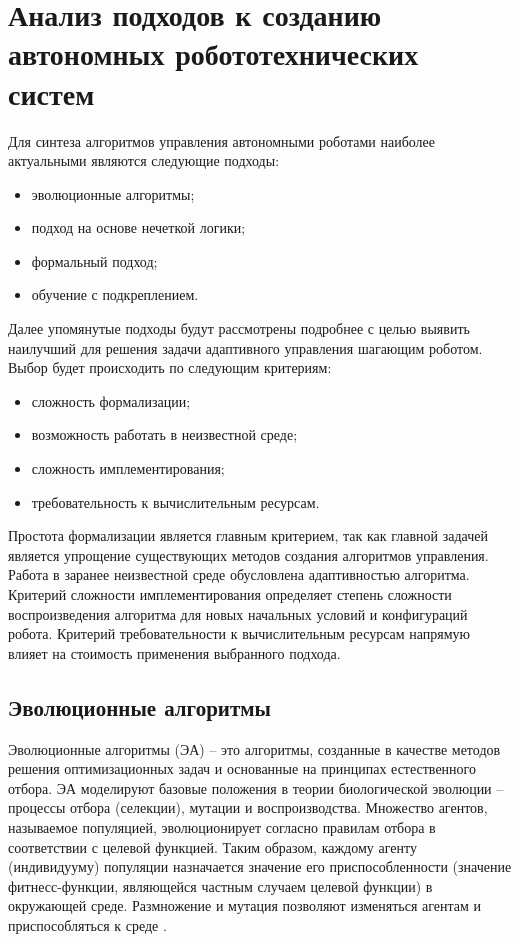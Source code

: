 \section{Анализ подходов к созданию автономных робототехнических систем} \label{literature}

Для синтеза алгоритмов управления автономными роботами наиболее актуальными являются следующие подходы:
\begin{itemize}
	\item эволюционные алгоритмы;
	\item подход на основе нечеткой логики;
	\item формальный подход;
	\item обучение с подкреплением.

\end{itemize}

Далее упомянутые подходы будут рассмотрены подробнее с целью выявить наилучший для решения задачи адаптивного управления шагающим роботом. 
Выбор будет происходить по следующим критериям:
\begin{itemize}
	\item сложность формализации;
	\item возможность работать в неизвестной среде;
	\item сложность имплементирования;
	\item требовательность к вычислительным ресурсам.
\end{itemize}

Простота формализации является главным критерием, так как главной задачей является упрощение существующих методов создания алгоритмов управления. 
Работа в заранее неизвестной среде обусловлена адаптивностью алгоритма. 
Критерий сложности имплементирования определяет степень сложности воспроизведения алгоритма для новых начальных условий и конфигураций робота. 
Критерий требовательности к вычислительным ресурсам напрямую влияет на стоимость применения выбранного подхода.


\subsection{Эволюционные алгоритмы}

Эволюционные алгоритмы (ЭА) – это алгоритмы, созданные в качестве методов решения оптимизационных задач и основанные на принципах естественного отбора. 
ЭА моделируют базовые положения в теории биологической эволюции -- процессы отбора (селекции), мутации и воспроизводства. 
Множество агентов, называемое популяцией, эволюционирует согласно правилам отбора в соответствии с целевой функцией. Таким образом, каждому агенту (индивидууму) популяции назначается значение его приспособленности (значение фитнесс-функции, являющейся частным случаем целевой функции) в окружающей среде. 
Размножение и мутация позволяют изменяться агентам и приспособляться к среде \cite{evolution}.

